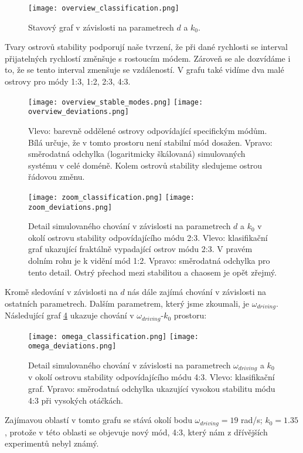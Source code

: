 \begin{figure}[H]
    \texttt{[image: overview\_classification.png]}
    \centering
    \caption{Stavový graf v závislosti na parametrech $d$ a $k_0$.}
    \label{fig:state_graph_whole}
\end{figure}

\clearpage

Tvary ostrovů stability podporují naše tvrzení, že při dané rychlosti se interval přijatelných rychlostí změnšuje s rostoucím módem. Zároveň se ale dozvídáme i to, že se tento interval zmenšuje se vzdáleností. V grafu také vidíme dva malé ostrovy pro módy 1:3, 1:2, 2:3, 4:3.

\begin{figure}[H]
    \texttt{[image: overview\_stable\_modes.png]}
    \texttt{[image: overview\_deviations.png]}
    \centering
    \caption[Barevné oddělení ostrovů stabilních módů a směrodatná odchylka.]{Vlevo: barevně oddělené ostrovy odpovídající specifickým módům. Bílá určuje, že v tomto prostoru není stabilní mód dosažen. Vpravo: směrodatná odchylka (logaritmicky škálovaná) simulovaných systému v celé doméně. Kolem ostrovů stability sledujeme ostrou řádovou změnu.}
    \label{fig:additional_graphs_whole}
\end{figure}

\begin{figure}[H]
    \texttt{[image: zoom\_classification.png]}
    \texttt{[image: zoom\_deviations.png]}
    \centering
    \caption[Detail simulovaného chování v závislosti na parametrech $d$ a $k_0$ v okolí ostrovu stability odpovídajícího módu 2:3.]{Detail simulovaného chování v závislosti na parametrech $d$ a $k_0$ v okolí ostrovu stability odpovídajícího módu 2:3. Vlevo: klasifikační graf ukazující fraktálně vypadající ostrov módu 2:3. V pravém dolním rohu je k vidění mód 1:2. Vpravo: směrodatná odchylka pro tento detail. Ostrý přechod mezi stabilitou a chaosem je opět zřejmý.}
    \label{fig:state_graph_zoom}
\end{figure}

Kromě sledování v závislosti na $d$ nás dále zajímá chování v závislosti na ostatních parametrech. Dalším parametrem, který jsme zkoumali, je $\omega_{driving}$. Následující graf \ref{fig:state_graph_omega} ukazuje chování v $\omega_{driving}$-$k_0$ prostoru:

\begin{figure}[H]
    \texttt{[image: omega\_classification.png]}
    \texttt{[image: omega\_deviations.png]}
    \centering
    \caption[Detail simulovaného chování v závislosti na parametrech $\omega_{driving}$ a $k_0$ v okolí ostrovu stability odpovídajícího módu 4:3.]{Detail simulovaného chování v závislosti na parametrech $\omega_{driving}$ a $k_0$ v okolí ostrovu stability odpovídajícího módu 4:3. Vlevo: klasifikační graf. Vpravo: směrodatná odchylka ukazující vysokou stabilitu módu 4:3 při vysokých otáčkách.}
    \label{fig:state_graph_omega}
\end{figure}

Zajímavou oblastí v tomto grafu se stává okolí bodu $\omega_{driving} = 19$ rad/s; $k_0=1.35$, protože v této oblasti se objevuje nový mód, 4:3, který nám z dřívějších experimentů nebyl známý.
